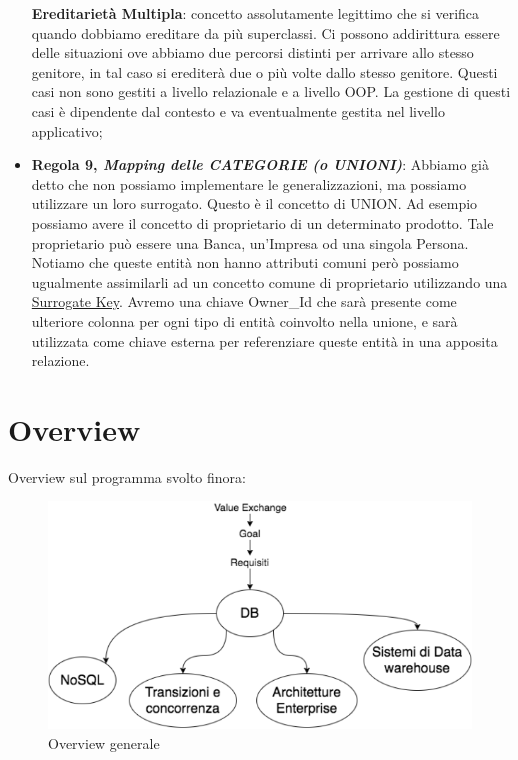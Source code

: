 \begin{itemize}
\textbf{Ereditarietà Multipla​}: concetto assolutamente legittimo che si verifica quando dobbiamo ereditare da più superclassi. Ci possono addirittura essere delle situazioni ove abbiamo due percorsi distinti per arrivare allo stesso genitore, in tal caso si erediterà due o più volte dallo stesso genitore. Questi casi non sono gestiti a livello relazionale e a livello OOP. La gestione di questi casi è dipendente dal contesto e va eventualmente gestita nel livello applicativo;  

\item{\textbf{Regola 9, \textit{Mapping delle CATEGORIE (o UNIONI)}}}: Abbiamo già detto che non possiamo implementare le generalizzazioni, ma possiamo utilizzare un loro surrogato. Questo è il concetto di UNION. Ad esempio possiamo avere il concetto di proprietario di un determinato prodotto. Tale proprietario può essere una Banca, un'Impresa od una singola Persona. Notiamo che queste entità non hanno attributi comuni però possiamo ugualmente assimilarli ad un concetto comune di proprietario utilizzando una \underline{Surrogate Key}​. Avremo una chiave Owner\_Id che sarà presente come ulteriore colonna per ogni tipo di entità coinvolto nella unione, e sarà utilizzata come chiave esterna per referenziare queste entità in una apposita relazione. 

\end{itemize}


\section{Overview}

Overview sul programma svolto finora:

\begin{center}
\begin{figure}[H]
\centering
\includegraphics[scale=1]{figures/overview.png}
\caption{Overview generale} 
\end{figure}
\end{center}

